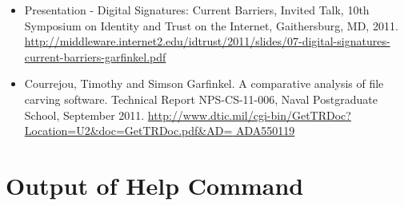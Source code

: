 \documentclass[11pt]{article} %
\begin{document}
\begin{itemize}
\item Presentation - Digital Signatures: Current Barriers, Invited Talk, 10th Symposium on Identity and Trust on the Internet, Gaithersburg, MD, 2011. \url{http://middleware.internet2.edu/idtrust/2011/slides/07-digital-signatures-current}\newline\url{-barriers-garfinkel.pdf}
\item Courrejou, Timothy and Simson Garfinkel. A comparative analysis of file carving software. Technical Report NPS-CS-11-006, Naval Postgraduate School, September 2011. \url{http://www.dtic.mil/cgi-bin/GetTRDoc?Location=U2&doc=GetTRDoc.pdf&AD=}\newline\url{ ADA550119}
\end{itemize}


 


\newpage
\appendix
\appendixpage



\section{Output of \bulk Help Command}
\label{HelpOutput}
\end{document}
